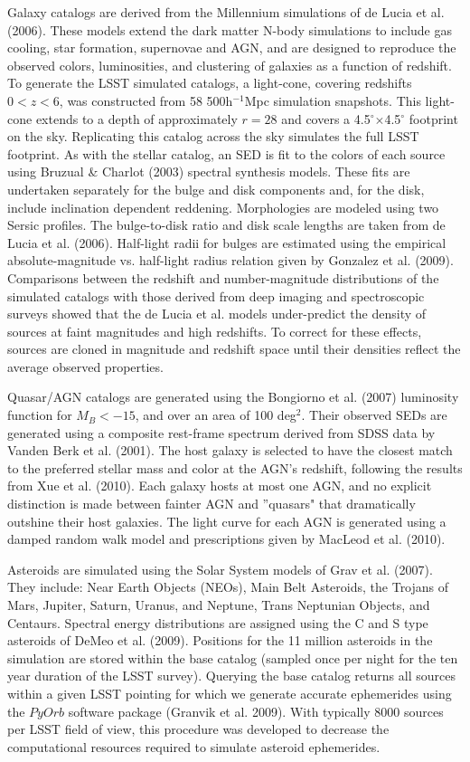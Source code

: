 \documentclass{emulateapj}
\begin{document}
{Galaxy catalogs are derived from the Millennium simulations of de
Lucia et al. (2006).  These models extend the dark matter N-body
simulations to include gas cooling, star formation, supernovae and
AGN, and are designed to reproduce the observed colors, luminosities,
and clustering of galaxies as a function of redshift. To generate the
LSST simulated catalogs, a light-cone, covering redshifts $0<z<6$, was
constructed from 58 500h$^{-1}$Mpc simulation snapshots. This
light-cone extends to a depth of approximately $r=28$ and covers a
4.5$^\circ$$\times$4.5$^\circ$ footprint on the sky. Replicating this
catalog across the sky simulates the full LSST footprint. As with the
stellar catalog, an SED is fit to the colors of each source using
Bruzual \& Charlot (2003) spectral synthesis models. These fits are
undertaken separately for the bulge and disk components and, for the
disk, include inclination dependent reddening. Morphologies are
modeled using two Sersic profiles. The bulge-to-disk ratio and disk
scale lengths are taken from de Lucia et al. (2006). Half-light radii
for bulges are estimated using the empirical absolute-magnitude
vs. half-light radius relation given by Gonzalez et
al. (2009). Comparisons between the redshift and number-magnitude
distributions of the simulated catalogs with those derived from deep
imaging and spectroscopic surveys showed that the de Lucia et
al. models under-predict the density of sources at faint magnitudes
and high redshifts. To correct for these effects, sources are cloned
in magnitude and redshift space until their densities reflect the
average observed properties.

Quasar/AGN catalogs are generated using the Bongiorno et al. (2007)
luminosity function for $M_B < -15$, and over an area of 100
deg$^2$. Their observed SEDs are generated using a composite
rest-frame spectrum derived from SDSS data by Vanden Berk et
al. (2001). The host galaxy is selected to have the closest match to
the preferred stellar mass and color at the AGN's redshift, following
the results from Xue et al. (2010).  Each galaxy hosts at most one
AGN, and no explicit distinction is made between fainter AGN and
''quasars" that dramatically outshine their host galaxies. The light
curve for each AGN is generated using a damped random walk model and
prescriptions given by MacLeod et al. (2010).

Asteroids are simulated using the Solar System models of Grav et
al. (2007). They include: Near Earth Objects (NEOs), Main Belt
Asteroids, the Trojans of Mars, Jupiter, Saturn, Uranus, and Neptune,
Trans Neptunian Objects, and Centaurs. Spectral energy distributions
are assigned using the C and S type asteroids of DeMeo et
al. (2009). Positions for the 11 million asteroids in the simulation
are stored within the base catalog (sampled once per night for the ten
year duration of the LSST survey). Querying the base catalog returns
all sources within a given LSST pointing for which we generate
accurate ephemerides using the $PyOrb$ software package (Granvik et
al. 2009). With typically 8000 sources per LSST field of view, this
procedure was developed to decrease the computational resources
required to simulate asteroid ephemerides.



}
\end{document}
